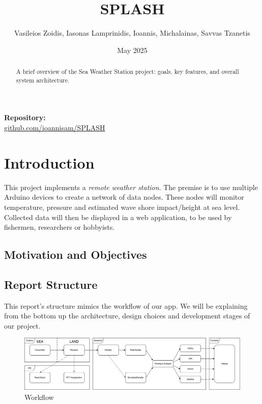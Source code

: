 \documentclass{article}
\title{SPLASH}
\author{Vasileios Zoidis, Iasonas Lamprinidis, Ioannis, Michalainas, Savvas Tzanetis}
\date{May 2025}
\begin{document}
\maketitle
\begin{center}
  \textbf{Repository:} \\
  \href{https://github.com/ioannisam/SPLASH}{github.com/ioannisam/SPLASH}
\end{center}
\bigskip
\begin{abstract}
    A brief overview of the Sea Weather Station project: goals, key features, and overall system architecture.
\end{abstract}
\tableofcontents
\clearpage

\section{Introduction}
This project implements a \textit{remote weather station}. The premise is to use multiple Arduino devices to create a network of data nodes. These nodes will monitor temperature, pressure and estimated wave shore impact/height at sea level. Collected data will then be displayed in a web application, to be used by fishermen, researchers or hobbyists.
    
    \subsection{Motivation and Objectives}
    
    \subsection{Report Structure}
    This report's structure mimics the workflow of our app. We will be explaining from the bottom up the architecture, design choices and development stages of our project.

    \begin{figure} [h]
        \centering
        \includegraphics[width=1\linewidth]{assets/workflow.png}
        \caption{Workflow}
        \label{fig:enter-label}
    \end{figure}
    
\end{document}
